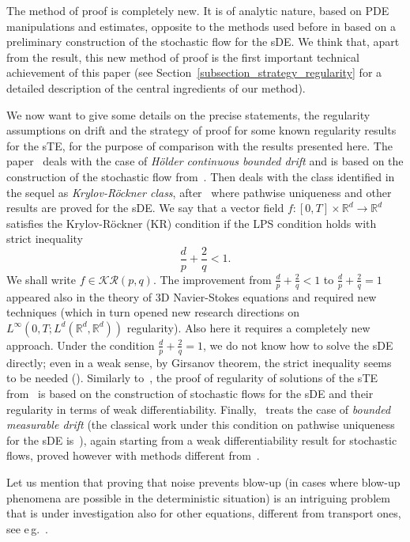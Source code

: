 \documentclass[a4paper,10pt]{article}
\begin{document}
The method of proof is completely new. It is of analytic nature, based on
PDE manipulations and estimates, opposite to the methods used before in 
\cite{FlGuPr4,FeFl,MoPrTh} based on a preliminary construction of
the stochastic flow for the sDE. We think that, apart from the result, this
new method of proof is the first important technical achievement of this
paper (see Section~\ref{subsection_strategy_regularity} for a detailed description of the central ingredients of our method).

We now want to give some details on the precise
statements, the regularity assumptions on drift and the strategy of proof for some known regularity results for the sTE, for the
purpose of comparison with the results presented here. The paper~\cite{FlGuPr4} deals
with the case of \textit{H\"{o}lder continuous bounded drift} and is based
on the construction of the stochastic flow from~\cite{FLAGUBPRI11}. Then 
\cite{FeFl} deals with the class identified in the sequel as \textit{Krylov-R\"{o}ckner class}, 
after~\cite{KRYROE05} where pathwise uniqueness and other
results are proved for the sDE. We say that a vector field $f \colon [ 0,T] \times\mathbb{R}^{d}\rightarrow\mathbb{R}^{d}$ satisfies the 
Krylov-R\"{o}ckner (KR) condition if the LPS condition holds with strict inequality
\begin{equation*}
\frac{d}{p}+\frac{2}{q}<1.
\end{equation*}
We shall write $f\in\mathcal{KR}(p,q)$. The improvement from 
$\frac{d}{p}+\frac{2}{q}<1$ to $\frac{d}{p}+\frac{2}{q}=1$ appeared also in
the theory of 3D Navier-Stokes equations and required new techniques (which
in turn opened new research directions on $L^{\infty}(0,T;L^{d}( 
\mathbb{R}^{d},\mathbb{R}^{d}) )$ regularity). Also here it
requires a completely new approach. Under the condition $\frac{d}{p}+\frac {2}{q}=1$, 
we do not know how to solve the sDE directly; even in a weak sense,
by Girsanov theorem, the strict inequality seems to be needed 
(\cite{KRYROE05,Po,GYOMAR01}). Similarly to~\cite{FlGuPr4}, the
proof of regularity of solutions of the sTE from~\cite{FeFl} is based on
the construction of stochastic flows for the sDE and their regularity in terms of weak
differentiability. Finally,~\cite{MoPrTh} treats the case of \textit{bounded
measurable drift} (the classical work under this condition on pathwise
uniqueness for the sDE is~\cite{Ve}), again starting from a weak
differentiability result for stochastic flows, proved however with methods
different from~\cite{FeFl}.

Let us mention that proving that noise prevents blow-up (in cases where  blow-up phenomena are possible in the deterministic situation) is an intriguing
problem that is under investigation also for other equations, different from
transport ones, see e\,g.\ \cite{CHOGUB13,DEBTSU11,DeFlVi,FLAGUBPRI10a,FlMaNe}.
\end{document}
